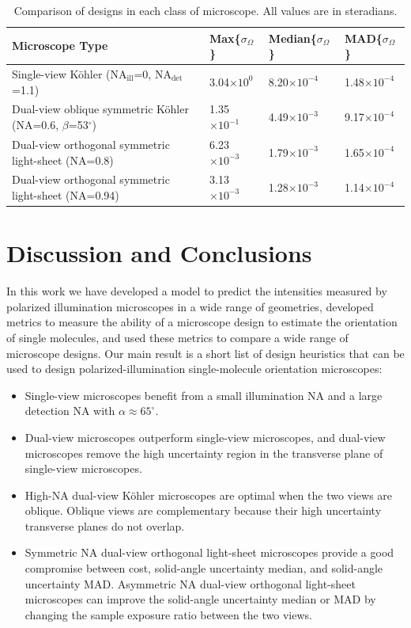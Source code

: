 \documentclass[10pt]{article}
\begin{document}
\begin{table}[ht!]
\centering
\caption{Comparison of designs in each class of microscope. All values are in
  steradians.}
\begin{tabular}{llll}
  \toprule
Microscope Type&Max\{$\sigma_{\Omega}$\}&Median\{$\sigma_{\Omega}$\}&MAD\{$\sigma_{\Omega}$\}\\ \midrule
Single-view K\"ohler (NA${}_\textrm{ill}$=0, NA${}_\textrm{det}$=1.1)&3.04$\times 10^{0}$&8.20$\times 10^{-4}$&1.48$\times 10^{-4}$ \\ 
  Dual-view oblique symmetric K\"ohler (NA=0.6, $\beta$=53${}^{\circ}$)&1.35$\times 10^{-1}$&4.49$\times 10^{-3}$&9.17$\times 10^{-4}$\\
Dual-view orthogonal symmetric light-sheet (NA=0.8)&6.23$\times 10^{-3}$&1.79$\times 10^{-3}$&1.65$\times 10^{-4}$\\  
Dual-view orthogonal symmetric light-sheet (NA=0.94)&3.13$\times 10^{-3}$&1.28$\times 10^{-3}$&1.14$\times 10^{-4}$\\
\bottomrule
\end{tabular}
\end{table}

\section{Discussion and Conclusions}\label{discussion}
In this work we have developed a model to predict the intensities measured by
polarized illumination microscopes in a wide range of geometries, developed
metrics to measure the ability of a microscope design to estimate the
orientation of single molecules, and used these metrics to compare a wide
range of microscope designs. Our main result is a short list of design
heuristics that can be used to design polarized-illumination single-molecule
orientation microscopes:
\begin{itemize}
\item Single-view microscopes benefit from a small illumination NA and a large
  detection NA with $\alpha \approx 65^{\circ}$.
\item Dual-view microscopes outperform single-view microscopes, and dual-view
  microscopes remove the high uncertainty region in the transverse plane of
  single-view microscopes.
\item High-NA dual-view K\"ohler microscopes are optimal when the two views are
  oblique. Oblique views are complementary because their high uncertainty
  transverse planes do not overlap.
\item Symmetric NA dual-view orthogonal light-sheet microscopes provide a good
  compromise between cost, solid-angle uncertainty median, and solid-angle
  uncertainty MAD. Asymmetric NA dual-view orthogonal light-sheet microscopes
  can improve the solid-angle uncertainty median or MAD by changing the sample
  exposure ratio between the two views.
\end{itemize}
\end{document}
